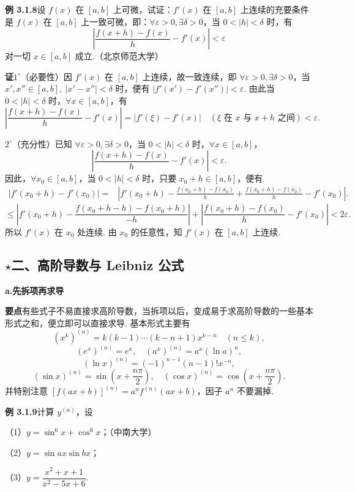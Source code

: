 \documentclass[UTF8, 12pt, fontset=fandol, oneside]{ctexart}
\begin{document}
\noindent\textbf{例 3.1.8}\quad 设 $f(x)$ 在 $[a,b]$ 上可微，试证：$f'(x)$ 在 $[a,b]$ 上连续的充要条件是 $f(x)$ 在 $[a,b]$ 上一致可微，即：$\forall\varepsilon>0,\exists\delta>0$，当 $0<|h|<\delta$ 时，有
\[
  \left|\frac{f(x+h)-f(x)}h-f'(x)\right|<\varepsilon
\]
对一切 $x\in[a,b]$ 成立.（北京师范大学）

\noindent\textbf{证}\quad $1^\circ$（必要性）因 $f'(x)$ 在 $[a,b]$ 上连续，故一致连续，即 $\forall\varepsilon>0,\exists\delta>0$，当 $x',x''\in[a,b],\ |x'-x''|<\delta$ 时，便有 $|f'(x')-f'(x'')|<\varepsilon$. 由此当 $0<|h|<\delta$ 时，$\forall x\in[a,b]$，有
\[
  \left|\frac{f(x+h)-f(x)}h-f'(x)\right|
  =|f'(\xi)-f'(x)|\quad(\xi\text{ 在 }x\text{ 与 }x+h\text{ 之间})
  <\varepsilon.
\]

$2^\circ$（充分性）已知 $\forall\varepsilon>0,\exists\delta>0$，当 $0<|h|<\delta$ 时，$\forall x\in[a,b]$，
\[
  \left|\frac{f(x+h)-f(x)}h-f'(x)\right|<\varepsilon.
\]
因此，$\forall x_0\in[a,b]$，当 $0<|h|<\delta$ 时，只要 $x_0+h\in[a,b]$，便有
\[
\begin{aligned}
|f'(x_0+h)-f'(x_0)|
=&\left|f'(x_0+h)-\frac{f(x_0+h)-f(x_0)}h
+\frac{f(x_0+h)-f(x_0)}h-f'(x_0)\right|.
\end{aligned}
\]
\[
\le\left|f'(x_0+h)-\frac{f(x_0+h-h)-f(x_0+h)}{-h}\right|
+\left|\frac{f(x_0+h)-f(x_0)}h-f'(x_0)\right|<2\varepsilon.
\]
所以 $f'(x)$ 在 $x_0$ 处连续. 由 $x_0$ 的任意性，知 $f'(x)$ 在 $[a,b]$ 上连续.

\subsection*{$\star$二、高阶导数与 Leibniz 公式}

\noindent\textbf{a.\quad 先拆项再求导}

\noindent\textbf{要点}\quad 有些式子不易直接求高阶导数，当拆项以后，变成易于求高阶导数的一些基本形式之和，便立即可以直接求导. 基本形式主要有
\[
  (x^k)^{(n)}=k(k-1)\cdots(k-n+1)x^{k-n}\quad(n\le k),
\]
\[
  (e^x)^{(n)}=e^x,\quad (a^x)^{(n)}=a^x(\ln a)^n,
\]
\[
  (\ln x)^{(n)}=(-1)^{n-1}(n-1)!x^{-n},
\]
\[
  (\sin x)^{(n)}=\sin\left(x+\frac{n\pi}2\right),\quad
  (\cos x)^{(n)}=\cos\left(x+\frac{n\pi}2\right).
\]
并特别注意 $[f(ax+b)]^{(n)}=a^n f^{(n)}(ax+b)$，因子 $a^n$ 不要漏掉.

\noindent\textbf{例 3.1.9}\quad 计算 $y^{(n)}$，设

（1）$y=\sin^6x+\cos^6x$；（中南大学）

（2）$y=\sin ax\sin bx$；

（3）$y=\dfrac{x^2+x+1}{x^2-5x+6}$.
\end{document}
